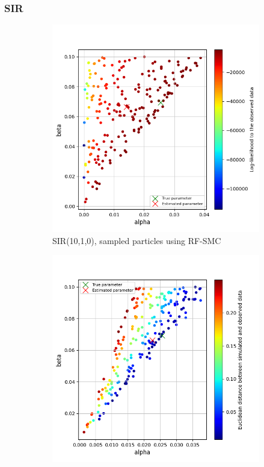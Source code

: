 \documentclass{beamer}
\begin{document}
\begin{frame}
    \frametitle{SIR}
    \begin{figure}[H]
        \centering
        \begin{subfigure}{0.48\textwidth}
            \centering
            \includegraphics[width=\linewidth]{figures/sir1010_rfsmc.png}
            \caption{SIR(10,1,0), sampled particles using RF-SMC}
        \end{subfigure}
        \hfill
        \begin{subfigure}{0.48\textwidth}
            \centering
            \includegraphics[width=\linewidth]{figures/sir1010_abcsmc.png}

\end{subfigure}
\end{figure}
\end{frame}
\end{document}
